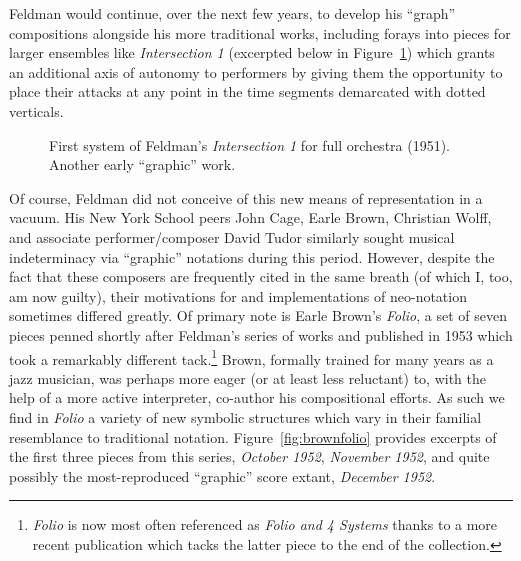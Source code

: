     Feldman would continue, over the next few years, to develop his ``graph'' compositions alongside his more traditional works, including forays into pieces for larger ensembles like \textit{Intersection 1} (excerpted below in Figure~\ref{fig:feldman2}) which grants an additional axis of autonomy to performers by giving them the opportunity to place their attacks at any point in the time segments demarcated with dotted verticals.

        \begin{figure}
            \centering
            \captionsetup{width=.5\textwidth}
            \caption[First system of Feldman's \textit{Intersection 1} for full orchestra (1951). Another early ``graphic'' work.]{First system of Feldman's \textit{Intersection 1} for full orchestra (1951). Another early ``graphic'' work.\footnotemark}
            \label{fig:feldman2}
        \end{figure}

    Of course, Feldman did not conceive of this new means of representation in a vacuum. His New York School peers John Cage, Earle Brown, Christian Wolff, and associate performer/composer David Tudor similarly sought musical indeterminacy via ``graphic'' notations during this period. However, despite the fact that these composers are frequently cited in the same breath (of which I, too, am now guilty), their motivations for and implementations of neo-notation sometimes differed greatly. Of primary note is Earle Brown's \textit{Folio}, a set of seven pieces penned shortly after Feldman's series of works and published in 1953 which took a remarkably different tack.\footnote{\textit{Folio} is now most often referenced as \textit{Folio and 4 Systems} thanks to a more recent publication which tacks the latter piece to the end of the collection.} Brown, formally trained for many years as a jazz musician, was perhaps more eager (or at least less reluctant) to, with the help of a more active interpreter, co-author his compositional efforts.\autocite{Ryan_2002} As such we find in \textit{Folio} a variety of new symbolic structures which vary in their familial resemblance to traditional notation. Figure~\ref{fig:brownfolio} provides excerpts of the first three pieces from this series, \textit{October 1952}, \textit{November 1952}, and quite possibly the most-reproduced ``graphic'' score extant, \textit{December 1952}.


